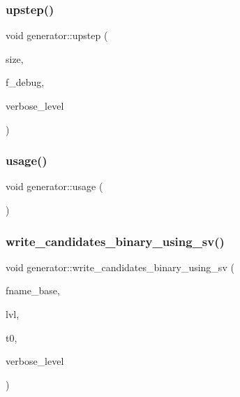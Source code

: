 \mbox{\label{classgenerator_ae0f2cebdabc821837f633656d7b0fdfe}} 
\subsubsection{\texorpdfstring{upstep()}{upstep()}}
{\footnotesize\ttfamily void generator\+::upstep (\begin{DoxyParamCaption}\item[{\mbox{\hyperlink{galois_8h_a09fddde158a3a20bd2dcadb609de11dc}{I\+NT}}}]{size,  }\item[{\mbox{\hyperlink{galois_8h_a09fddde158a3a20bd2dcadb609de11dc}{I\+NT}}}]{f\+\_\+debug,  }\item[{\mbox{\hyperlink{galois_8h_a09fddde158a3a20bd2dcadb609de11dc}{I\+NT}}}]{verbose\+\_\+level }\end{DoxyParamCaption})}

\mbox{\label{classgenerator_a5c264330f09efcfe0d364fbccdba9f14}} 
\subsubsection{\texorpdfstring{usage()}{usage()}}
{\footnotesize\ttfamily void generator\+::usage (\begin{DoxyParamCaption}{ }\end{DoxyParamCaption})}

\mbox{\label{classgenerator_aef2d3e1048ee00437c56b95685aaff88}} 
\subsubsection{\texorpdfstring{write\+\_\+candidates\+\_\+binary\+\_\+using\+\_\+sv()}{write\_candidates\_binary\_using\_sv()}}
{\footnotesize\ttfamily void generator\+::write\+\_\+candidates\+\_\+binary\+\_\+using\+\_\+sv (\begin{DoxyParamCaption}\item[{\mbox{\hyperlink{galois_8h_ab6cc7b4aeb6ea31aba2b3fbfc83ff5e6}{B\+Y\+TE}} $\ast$}]{fname\+\_\+base,  }\item[{\mbox{\hyperlink{galois_8h_a09fddde158a3a20bd2dcadb609de11dc}{I\+NT}}}]{lvl,  }\item[{\mbox{\hyperlink{galois_8h_a09fddde158a3a20bd2dcadb609de11dc}{I\+NT}}}]{t0,  }\item[{\mbox{\hyperlink{galois_8h_a09fddde158a3a20bd2dcadb609de11dc}{I\+NT}}}]{verbose\+\_\+level }\end{DoxyParamCaption})}

